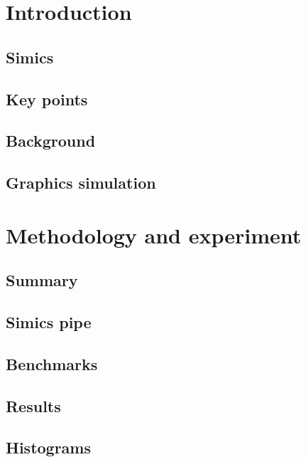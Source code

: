\documentclass{beamer}
\begin{document}
	

	\section{Introduction}

	\subsection{Simics}
	

	\subsection{Key points}
	

        \subsection{Background}
        

	\subsection{Graphics simulation}
	

        \section{Methodology and experiment}

        \subsection{Summary}
	

	\subsection{Simics pipe}
	

        \subsection{Benchmarks}
	

        \subsection{Results}
        

        \subsection{Histograms}
	
\end{document}

